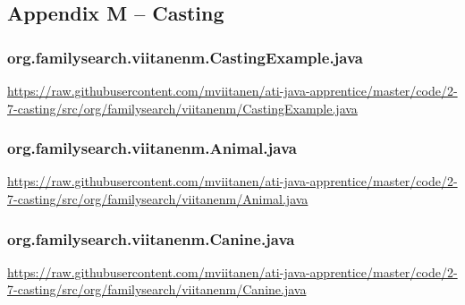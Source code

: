 \subsection*{Appendix M -- Casting} \label{App:AppendixM}

\subsubsection*{org.familysearch.viitanenm.CastingExample.java}
\noindent
\begin{minipage}{.6in}
\end{minipage}
\begin{minipage}{6in}
  \url{https://raw.githubusercontent.com/mviitanen/ati-java-apprentice/master/code/2-7-casting/src/org/familysearch/viitanenm/CastingExample.java}
\end{minipage}

\vspace{1em}
\subsubsection*{org.familysearch.viitanenm.Animal.java}
\noindent
\begin{minipage}{.6in}
\end{minipage}
\begin{minipage}{6in}
  \url{https://raw.githubusercontent.com/mviitanen/ati-java-apprentice/master/code/2-7-casting/src/org/familysearch/viitanenm/Animal.java}
\end{minipage}

\vspace{1em}
\subsubsection*{org.familysearch.viitanenm.Canine.java}
\noindent
\begin{minipage}{.6in}
\end{minipage}
\begin{minipage}{6in}
  \url{https://raw.githubusercontent.com/mviitanen/ati-java-apprentice/master/code/2-7-casting/src/org/familysearch/viitanenm/Canine.java}
\end{minipage}

